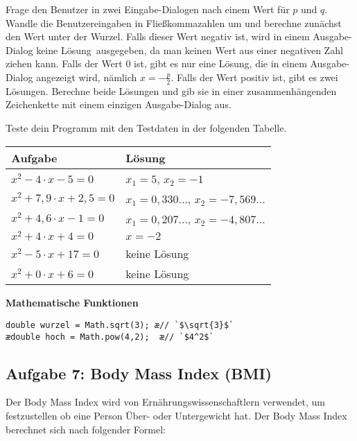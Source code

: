 Frage den Benutzer in zwei Eingabe-Dialogen nach einem Wert für $p$ und $q$.
Wandle die Benutzereingaben in Fließkommazahlen um und berechne zunächst den
Wert unter der Wurzel. Falls dieser Wert negativ ist, wird in einem
Ausgabe-Dialog \glqq keine Lösung\grqq\ ausgegeben, da man keinen Wert aus
einer negativen Zahl ziehen kann. Falls der Wert 0 ist, gibt es nur eine Lösung,
die in einem Ausgabe-Dialog angezeigt wird, nämlich $x = - \frac{p}{2}$. Falls
der Wert positiv ist, gibt es zwei Lösungen. Berechne beide Lösungen und gib
sie in einer zusammenhängenden Zeichenkette mit einem einzigen Ausgabe-Dialog
aus.

Teste dein Programm mit den Testdaten in der folgenden Tabelle.

\begin{minipage}{0.58\textwidth}
\begin{tabular}{|l|l|}\hline
\textbf{Aufgabe} & \textbf{Lösung}
\\ \hline
$x^2 - 4 \cdot x - 5 = 0$ & $x_1 = 5$, $x_2 = -1$
\\ 
$x^2 + 7,9 \cdot x + 2,5 = 0$ & $x_1 = 0,330\ldots$, $x_2 = -7,569\ldots$
\\ 
$x^2 + 4,6 \cdot x - 1 = 0$ & $x_1 = 0,207\ldots$, $x_2 = -4,807\ldots$
\\ 
$x^2 + 4 \cdot x + 4 = 0$ & $x = -2$
\\ 
$x^2 - 5 \cdot x + 17 = 0$ & keine Lösung
\\ 
$x^2 + 0 \cdot x + 6 = 0$ & keine Lösung
\\ \hline
\end{tabular}
\end{minipage}\hfill
\begin{minipage}{0.42\textwidth}
\textbf{Mathematische Funktionen}

\begin{lstlisting}
double wurzel = Math.sqrt(3); æ// `$\sqrt{3}$`
ædouble hoch = Math.pow(4,2);  æ// `$4^2$`
\end{lstlisting}
\end{minipage}


\subsection{Aufgabe 7: Body Mass Index (BMI)}

Der Body Mass Index wird von
Ernährungswissenschaftlern verwendet, um festzustellen
ob eine Person Über- oder Untergewicht hat. Der Body
Mass Index berechnet sich nach folgender Formel:

